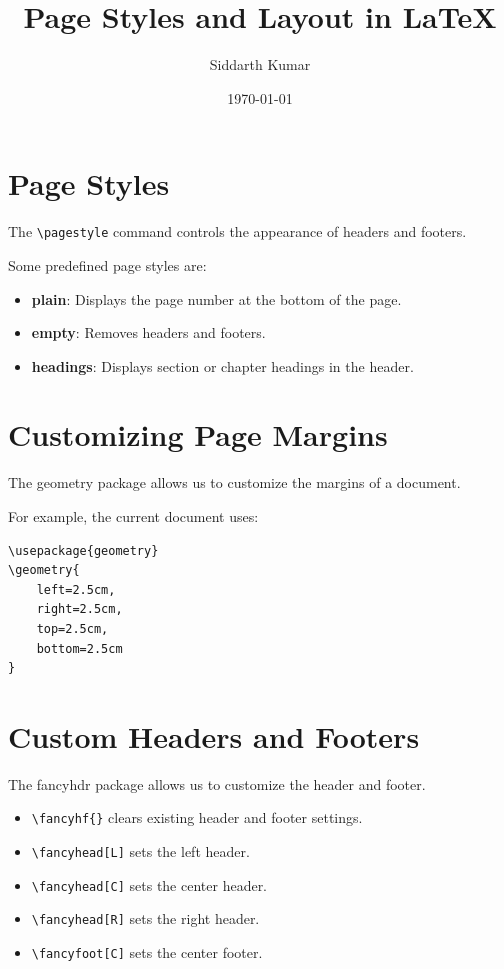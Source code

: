 \documentclass[12pt,a4paper]{article}
\title{Page Styles and Layout in LaTeX}
\author{Siddarth Kumar}
\date{\today}
\begin{document}
\maketitle

\section{Page Styles}

The \texttt{\textbackslash pagestyle} command
controls the appearance of headers and footers.

Some predefined page styles are:

\begin{itemize}
    \item \textbf{plain}: Displays the page number
    at the bottom of the page.

    \item \textbf{empty}: Removes headers and footers.

    \item \textbf{headings}: Displays section or
    chapter headings in the header.
\end{itemize}

\section{Customizing Page Margins}

The geometry package allows us to customize
the margins of a document.

For example, the current document uses:

\begin{verbatim}
\usepackage{geometry}
\geometry{
    left=2.5cm,
    right=2.5cm,
    top=2.5cm,
    bottom=2.5cm
}
\end{verbatim}

\section{Custom Headers and Footers}

The fancyhdr package allows us to customize
the header and footer.

\begin{itemize}
    \item \texttt{\textbackslash fancyhf\{\}} clears
    existing header and footer settings.

    \item \texttt{\textbackslash fancyhead[L]}
    sets the left header.

    \item \texttt{\textbackslash fancyhead[C]}
    sets the center header.

    \item \texttt{\textbackslash fancyhead[R]}
    sets the right header.

    \item \texttt{\textbackslash fancyfoot[C]}
    sets the center footer.
\end{itemize}
\end{document}
